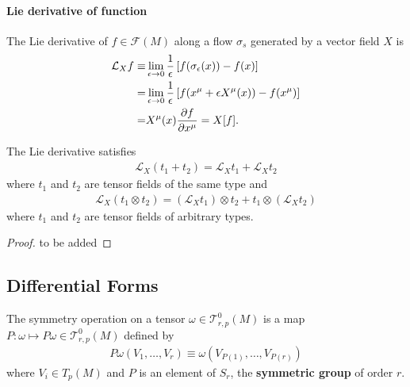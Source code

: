 \documentclass[10pt]{article}
\begin{document}
\paragraph{Lie derivative of function}The Lie derivative of $f\in\mathcal{F}(M)$ along a flow $\sigma_s$ generated by a vector field $X$ is
\begin{align}
    \mathcal{L}_X f\equiv & \lim_{\epsilon\to0}\frac{1}{\epsilon}\left[f(\sigma_\epsilon(x))-f(x)\right]\notag          \\
    =                     & \lim_{\epsilon\to0}\frac{1}{\epsilon}\left[f(x^\mu+\epsilon X^\mu(x))-f(x^\mu)\right]\notag \\
    =                     & X^\mu(x)\pdv{f}{x^\mu}=X[f].
\end{align}

\begin{proposition}
    The Lie derivative satisfies
    \begin{align}
        \mathcal{L}_X(t_1+t_2)=\mathcal{L}_X t_1+\mathcal{L}_X t_2
    \end{align}
    where $t_1$ and $t_2$ are tensor fields of the same type and
    \begin{align}
        \mathcal{L}_X(t_1\otimes t_2)=(\mathcal{L}_X t_1)\otimes t_2+t_1\otimes(\mathcal{L}_X t_2)
    \end{align}
    where $t_1$ and $t_2$ are tensor fields of arbitrary types.
\end{proposition}
\begin{proof}
    to be added
\end{proof}



\subsection{Differential Forms}
The symmetry operation on a tensor $\omega\in\mathcal{T}^0_{r,p}(M)$ is a map $P:\omega\mapsto P\omega\in\mathcal{T}^0_{r,p}(M)$ defined by
\begin{align}
    P\omega(V_1,\dots,V_r)\equiv\omega(V_{P(1)},\dots,V_{P(r)})
\end{align}
where $V_i\in T_p(M)$ and $P$ is an element of $S_r$, the \textbf{symmetric group} of order $r$.
\end{document}
